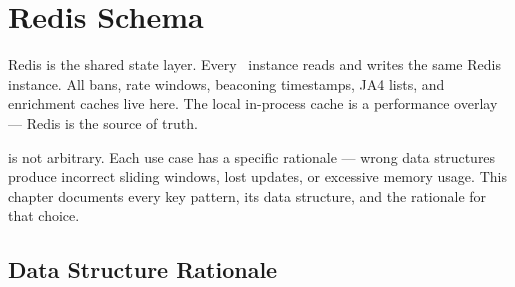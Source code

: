 
\chapter{Redis Schema}
\label{ch:redis}

\begin{chapterquote}
Redis is the shared state layer. Every \ja\ instance reads and writes the same
Redis instance. All bans, rate windows, beaconing timestamps, JA4 lists, and
enrichment caches live here. The local in-process cache is a performance overlay —
Redis is the source of truth.
\end{chapterquote}

 is not arbitrary. Each use case has a
specific rationale — wrong data structures produce incorrect sliding windows,
lost updates, or excessive memory usage. This chapter documents every key pattern,
its data structure, and the rationale for that choice.

\section{Data Structure Rationale}

